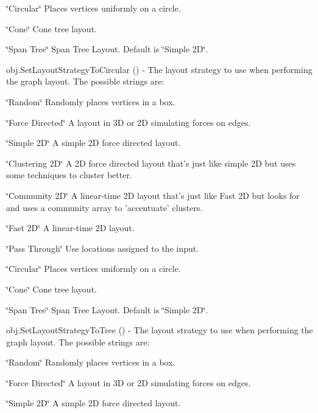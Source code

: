 \begin{DoxyItemize}
\begin{DoxyItemize}
\item \char`\"{}\-Circular\char`\"{} Places vertices uniformly on a circle.
\item \char`\"{}\-Cone\char`\"{} Cone tree layout.
\item \char`\"{}\-Span Tree\char`\"{} Span Tree Layout. Default is \char`\"{}\-Simple 2\-D\char`\"{}.  
\end{DoxyItemize}
\item {\ttfamily obj.\-Set\-Layout\-Strategy\-To\-Circular ()} -\/ The layout strategy to use when performing the graph layout. The possible strings are\-:
\begin{DoxyItemize}
\item \char`\"{}\-Random\char`\"{} Randomly places vertices in a box.
\item \char`\"{}\-Force Directed\char`\"{} A layout in 3\-D or 2\-D simulating forces on edges.
\item \char`\"{}\-Simple 2\-D\char`\"{} A simple 2\-D force directed layout.
\item \char`\"{}\-Clustering 2\-D\char`\"{} A 2\-D force directed layout that's just like simple 2\-D but uses some techniques to cluster better.
\item \char`\"{}\-Community 2\-D\char`\"{} A linear-\/time 2\-D layout that's just like Fast 2\-D but looks for and uses a community array to 'accentuate' clusters.
\item \char`\"{}\-Fast 2\-D\char`\"{} A linear-\/time 2\-D layout.
\item \char`\"{}\-Pass Through\char`\"{} Use locations assigned to the input.
\item \char`\"{}\-Circular\char`\"{} Places vertices uniformly on a circle.
\item \char`\"{}\-Cone\char`\"{} Cone tree layout.
\item \char`\"{}\-Span Tree\char`\"{} Span Tree Layout. Default is \char`\"{}\-Simple 2\-D\char`\"{}.  
\end{DoxyItemize}
\item {\ttfamily obj.\-Set\-Layout\-Strategy\-To\-Tree ()} -\/ The layout strategy to use when performing the graph layout. The possible strings are\-:
\begin{DoxyItemize}
\item \char`\"{}\-Random\char`\"{} Randomly places vertices in a box.
\item \char`\"{}\-Force Directed\char`\"{} A layout in 3\-D or 2\-D simulating forces on edges.
\item \char`\"{}\-Simple 2\-D\char`\"{} A simple 2\-D force directed layout.

\end{DoxyItemize}
\end{DoxyItemize}

